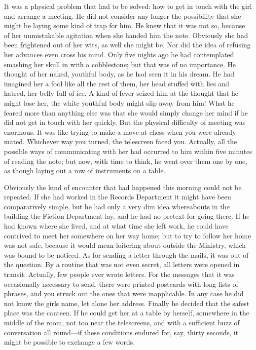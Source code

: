 It was a physical problem that had to be solved: how to get in touch
with the girl and arrange a meeting. He did not consider any longer the
possibility that she might be laying some kind of trap for him. He knew
that it was not so, because of her unmistakable agitation when she
handed him the note. Obviously she had been frightened out of her wits,
as well she might be. Nor did the idea of refusing her advances even
cross his mind. Only five nights ago he had contemplated smashing her
skull in with a cobblestone; but that was of no importance. He thought
of her naked, youthful body, as he had seen it in his dream. He had
imagined her a fool like all the rest of them, her head stuffed with
lies and hatred, her belly full of ice. A kind of fever seized him at
the thought that he might lose her, the white youthful body might slip
away from him! What he feared more than anything else was that she would
simply change her mind if he did not get in touch with her quickly. But
the physical difficulty of meeting was enormous. It was like trying to
make a move at chess when you were already mated. Whichever way you
turned, the telescreen faced you. Actually, all the possible ways of
communicating with her had occurred to him within five minutes of
reading the note; but now, with time to think, he went over them one by
one, as though laying out a row of instruments on a table.

Obviously the kind of encounter that had happened this morning could not
be repeated. If she had worked in the Records Department it might have
been comparatively simple, but he had only a very dim idea whereabouts
in the building the Fiction Department lay, and he had no pretext for
going there. If he had known where she lived, and at what time she left
work, he could have contrived to meet her somewhere on her way home; but
to try to follow her home was not safe, because it would mean loitering
about outside the Ministry, which was bound to be noticed. As for
sending a letter through the mails, it was out of the question. By a
routine that was not even secret, all letters were opened in transit.
Actually, few people ever wrote letters. For the messages that it was
occasionally necessary to send, there were printed postcards with long
lists of phrases, and you struck out the ones that were inapplicable. In
any case he did not know the girl\textquotesingle s name, let alone her
address. Finally he decided that the safest place was the canteen. If he
could get her at a table by herself, somewhere in the middle of the
room, not too near the telescreens, and with a sufficient buzz of
conversation all round---if these conditions endured for, say, thirty
seconds, it might be possible to exchange a few words.

